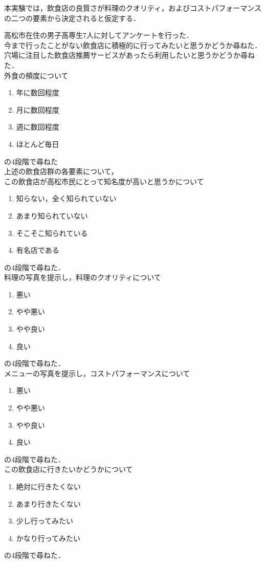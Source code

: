 		本実験では，飲食店の良質さが料理のクオリティ，およびコストパフォーマンスの二つの要素から決定されると仮定する．\par
		高松市在住の男子高専生7人に対してアンケートを行った．\\
		今まで行ったことがない飲食店に積極的に行ってみたいと思うかどうか尋ねた．\\
		穴場に注目した飲食店推薦サービスがあったら利用したいと思うかどうか尋ねた．\\
		外食の頻度について
		\begin{enumerate}
			\item 年に数回程度
			\item 月に数回程度
			\item 週に数回程度
			\item ほとんど毎日
		\end{enumerate}
		の4段階で尋ねた\\
		上述の飲食店群の各要素について，\\
		この飲食店が高松市民にとって知名度が高いと思うかについて
		\begin{enumerate}
			\item 知らない，全く知られていない
			\item あまり知られていない
			\item そこそこ知られている
			\item 有名店である
		\end{enumerate}
		の4段階で尋ねた．\\
		料理の写真を提示し，料理のクオリティについて
		\begin{enumerate}
			\item 悪い
			\item やや悪い
			\item やや良い
			\item 良い
		\end{enumerate}
		の4段階で尋ねた．\\
		メニューの写真を提示し，コストパフォーマンスについて
		\begin{enumerate}
			\item 悪い
			\item やや悪い
			\item やや良い
			\item 良い
		\end{enumerate}
		の4段階で尋ねた．\\
		この飲食店に行きたいかどうかについて
		\begin{enumerate}
			\item 絶対に行きたくない
			\item あまり行きたくない
			\item 少し行ってみたい
			\item かなり行ってみたい
		\end{enumerate}
		の4段階で尋ねた．\\

